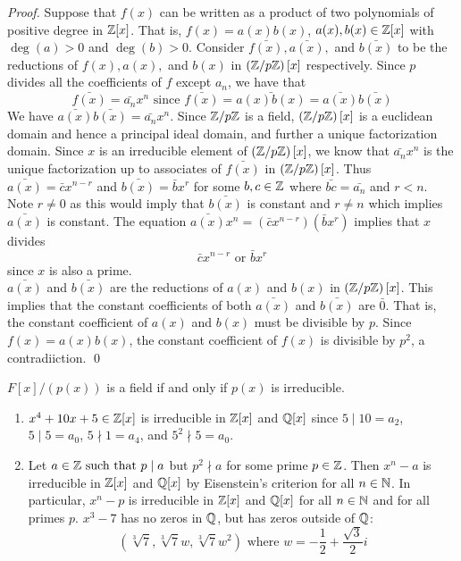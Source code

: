 \begin{proof}
    Suppose that $f(x)$ can be written as a product of two polynomials of positive degree in $\mathbb{Z}[x]$. That is, $f(x) = a(x)b(x)$, $a(x),b(x)\in \mathbb{Z}[x]$ with $\deg(a) > 0$ and $\deg(b) > 0$. Consider $\bar{f(x)}, \bar{a(x)},$ and $\bar{b(x)}$ to be the reductions of $f(x), a(x), $ and $b(x)$ in $\left(\mathbb{Z}/p\mathbb{Z}\right)[x]$ respectively. Since $p$ divides all the coefficients of $f$ except $a_n$, we have that
    $$\bar{f(x)} = \bar{a_n}x^n \text{ since } \bar{f(x)} = \bar{a(x)b(x)} = \bar{a(x)} \bar{b(x)}$$
    We have $\bar{a(x)} \bar{b(x)}=\bar{a_n}x^n$. Since $\mathbb{Z}/p\mathbb{Z}$ is a field, $\left(\mathbb{Z}/p\mathbb{Z}\right)[x]$ is a euclidean domain and hence a principal ideal domain, and further a unique factorization domain. Since $x$ is an irreducible element of $\left(\mathbb{Z}/p\mathbb{Z}\right)[x]$, we know that $\bar{a_n}x^n$ is the unique factorization up to associates of $\bar{f(x)}$ in $\left(\mathbb{Z}/p\mathbb{Z}\right)[x]$. Thus $\bar{a(x)}=\bar{c}x^{n-r}$ and $\bar{b(x)}=\bar{b}x^r$ for some $b,c \in \mathbb{Z}$ where $\bar{bc}=\bar{a_n}$ and $r < n.$ Note $r\neq 0$ as this would imply that $\bar{b(x)}$ is constant and $r\neq n$ which implies $\bar{a(x)}$ is constant. The equation $\bar{a(x)}x^n = (\bar{c}x^{n-r})(\bar{b}x^r)$ implies that $x$ divides
    $$\bar{c}x^{n-r} \text{ or } \bar{b}x^r$$
    since $x$ is also a prime. \\
    $\bar{a(x)}$ and $\bar{b(x)}$ are the reductions of $a(x)$ and $b(x)$ in $\left(\mathbb{Z}/p\mathbb{Z}\right)[x]$. This implies that the constant coefficients of both $\bar{a(x)}$ and $\bar{b(x)}$ are $\bar{0}$. That is, the constant coefficient of $a(x)$ and $b(x)$ must be divisible by $p$. Since $f(x) = a(x)b(x)$, the constant coefficient of $f(x)$ is divisible by $p^2$, a contradiiction.
    \qed
\end{proof}

\begin{proposition}
    $F[x]/(p(x))$ is a field if and only if $p(x)$ is irreducible.
\end{proposition}

\begin{example}
    \begin{enumerate}
        \item $x^4+10x+5 \in \mathbb{Z}[x]$ is irreducible in $\mathbb{Z}[x]$ and $\mathbb{Q}[x]$ since $5\mid 10 = a_2$, $5 \mid 5 = a_0$, $5 \nmid 1 = a_4$, and $5^2 \nmid 5 = a_0$.
        \item Let $a \in \mathbb{Z} \text{ such that } p \mid a$ but $p^2 \nmid a$ for some prime $p \in \mathbb{Z}$. Then $x^n-a$ is irreducible in $\mathbb{Z}[x]$ and $\mathbb{Q}[x]$ by Eisenstein's criterion for all $n \in \mathbb{N}$. In particular, $x^n - p$ is irreducible in $\mathbb{Z}[x]$ and $\mathbb{Q}[x]$ for all $n \in \mathbb{N}$ and for all primes $p$. $x^3-7$ has no zeros in $\mathbb{Q}$, but has zeros outside of $\mathbb{Q}$:
        $$(\sqrt[3]{7}, \sqrt[3]{7}w, \sqrt[3]{7} w^2) \text{ where } w = -\frac{1}{2}+\frac{\sqrt{3}}{2} i$$
    \end{enumerate}
\end{example}


